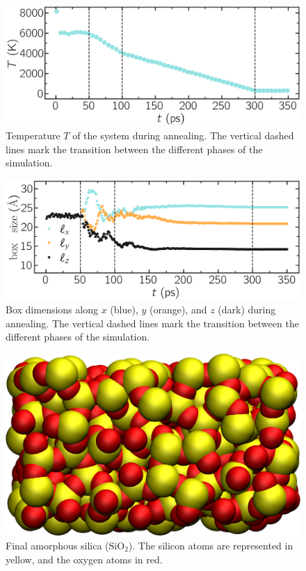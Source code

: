\documentclass[9pt,tutorial]{livecoms}
\begin{document}
\begin{figure}
\centering
\includegraphics[width=\linewidth]{GCMC-temperature}
\caption{Temperature $T$ of the system during annealing. The vertical dashed lines mark the transition between the different phases of the simulation.}
\label{fig:GCMC-temperature}
\end{figure}

\begin{figure}
\centering
\includegraphics[width=\linewidth]{GCMC-dimension}
\caption{Box dimensions along $x$ (blue), $y$ (orange), and $z$ (dark) during annealing. The vertical dashed lines mark the transition between the different phases of the simulation.}
\label{fig:GCMC-dimension}
\end{figure}

\begin{figure}
\centering
\includegraphics[width=0.9\linewidth]{GCMC-snapshot}
\caption{Final amorphous silica ($\text{SiO}_2$). The silicon atoms are represented in yellow, and the oxygen atoms in red.}
\label{fig:GCMC-snapshot}
\end{figure}
\end{document}
